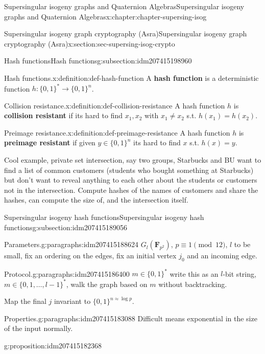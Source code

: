 \documentclass[oneside,10pt,]{book}
\newcommand{\terminology}[1]{\textbf{#1}}
\numberwithin{equation}{section}
\newcommand{\FF}{\mathbf{F}}
\begin{document}
\begin{chapterptx}{Supersingular isogeny graphs and Quaternion Algebras}{}{Supersingular isogeny graphs and Quaternion Algebras}{}{}{x:chapter:chapter-supersing-isog}
\begin{sectionptx}{Supersingular isogeny graph cryptography (Asra)}{}{Supersingular isogeny graph cryptography (Asra)}{}{}{x:section:sec-supersing-isog-crypto}
\begin{subsectionptx}{Hash functions}{}{Hash functions}{}{}{g:subsection:idm207415198960}
\begin{definition}{Hash functions.}{x:definition:def-hash-function}
A \terminology{hash function} is a deterministic function \(h\colon \{0,1\}^* \to \{0,1\}^n\).%
\end{definition}
\begin{definition}{Collision resistance.}{x:definition:def-collision-resistance}%
A hash function \(h\) is \terminology{collision resistant} if its hard to find \(x_1,x_2\) with \(x_1\ne x_2 \) s.t. \(h(x_1) = h(x_2)\).%
\end{definition}
\begin{definition}{Preimage resistance.}{x:definition:def-preimage-resistance}%
A hash function \(h\) is \terminology{preimage resistant} if given \(y\in \{0,1\}^n\) its hard to find \(x\) s.t. \(h(x) = y\).%
\end{definition}
Cool example, private set intersection, say two groups, Starbucks and BU want to find a list of common customers (students who bought something at Starbucks) but don't want to reveal anything to each other about the students or customers not in the intersection. Compute hashes of the names of customers and share the hashes, can compute the size of, and the intersection itself.%
\end{subsectionptx}
%
%
\typeout{************************************************}
\typeout{************************************************}
%
\begin{subsectionptx}{Supersingular isogeny hash functions}{}{Supersingular isogeny hash functions}{}{}{g:subsection:idm207415189056}
\begin{paragraphs}{Parameters.}{g:paragraphs:idm207415188624}%
\(G_l(\FF_{p^2})\), \(p \equiv 1 \pmod{12}\), \(l\) to be small, fix an ordering on the edges, fix an initial vertex \(j_0\) and an incoming edge.%
\end{paragraphs}%
\begin{paragraphs}{Protocol.}{g:paragraphs:idm207415186400}%
\(m \in \{0,1\}^*\) write this as an \(l\)-bit string, \(m \in \{0,1,\ldots, l-1\}^*\), walk the graph based on \(m\) without backtracking.%
\par
Map the final \(j\) invariant to  \(\{0,1\}^{n\approx \log p}\).%
\end{paragraphs}%
\begin{paragraphs}{Properties.}{g:paragraphs:idm207415183088}%
Difficult means exponential in the size of the input normally.%
\begin{proposition}{}{}{g:proposition:idm207415182368}%
%
\begin{enumerate}

\end{enumerate}
\end{proposition}
\end{paragraphs}
\end{subsectionptx}
\end{sectionptx}
\end{chapterptx}
\end{document}
